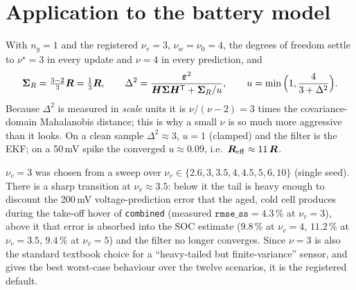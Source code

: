 \section{Application to the battery model}
With $n_y=1$ and the registered $\nu_v=3$, $\nu_w=\nu_0=4$, the degrees of freedom settle to
$\nu^\star=3$ in every update and $\nu=4$ in every prediction, and
\begin{equation}
\bm\Sigma_R=\tfrac{3-2}{3}\bm{R}=\tfrac13\bm{R},\qquad
\Delta^2=\frac{\bm{\varepsilon}^2}{\bm{H}\bm\Sigma\bm{H}^{\mathsf{T}}+\bm\Sigma_R/u},\qquad
u=\min\Big(1,\frac{4}{3+\Delta^2}\Big).
\label{eq:st-batt}
\end{equation}
Because $\Delta^2$ is measured in \emph{scale} units it is $\nu/(\nu-2)=3$ times the
covariance-domain Mahalanobis distance; this is why a small $\nu$ is so much more aggressive than
it looks.  On a clean sample $\Delta^2\approx3$, $u=1$ (clamped) and the filter is the EKF; on a
50\,mV spike the converged $u\approx0.09$, i.e.\ $\bm{R}_{\mathrm{eff}}\approx11\,\bm{R}$.

$\nu_v=3$ was chosen from a sweep over $\nu_v\in\{2.6,3,3.5,4,4.5,5,6,10\}$ (single seed).  There
is a sharp transition at $\nu_v\approx3.5$: below it the tail is heavy enough to discount the
200\,mV voltage-prediction error that the aged, cold cell produces during the take-off hover of
\texttt{combined} (measured $\texttt{rmse\_ss}=4.3\,\%$ at $\nu_v=3$), above it that error is
absorbed into the SOC estimate ($9.8\,\%$ at $\nu_v=4$, $11.2\,\%$ at $\nu_v=3.5$, $9.4\,\%$ at
$\nu_v=5$) and the filter no longer converges.  Since $\nu=3$ is also the standard textbook choice for a
``heavy-tailed but finite-variance'' sensor, and gives the best worst-case behaviour over the
twelve scenarios, it is the registered default.

